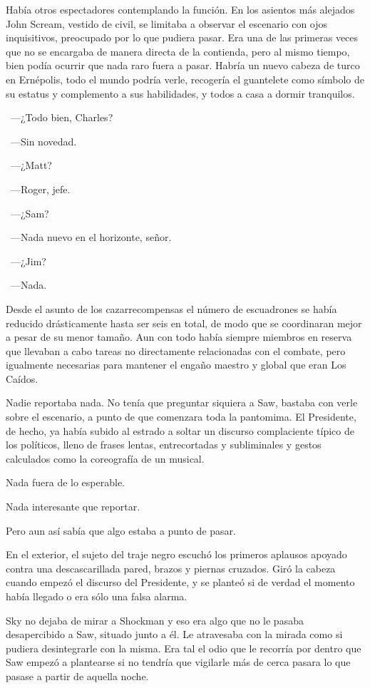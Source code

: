 Había otros espectadores contemplando la función. En los asientos más alejados John Scream, vestido de civil, se limitaba a observar el escenario con ojos inquisitivos, preocupado por lo que pudiera pasar. Era una de las primeras veces que no se encargaba de manera directa de la contienda, pero al mismo tiempo, bien podía ocurrir que nada raro fuera a pasar. Habría un nuevo cabeza de turco en Ernépolis, todo el mundo podría verle, recogería el guantelete como símbolo de su estatus y complemento a sus habilidades, y todos a casa a dormir tranquilos.

~---¿Todo bien, Charles?

~---Sin novedad.

~---¿Matt?

~---Roger, jefe.

~---¿Sam?

~---Nada nuevo en el horizonte, señor.

~---¿Jim?

~---Nada.

Desde el asunto de los cazarrecompensas el número de escuadrones se había reducido drásticamente hasta ser seis en total, de modo que se coordinaran mejor a pesar de su menor tamaño. Aun con todo había siempre miembros en reserva que llevaban a cabo tareas no directamente relacionadas con el combate, pero igualmente necesarias para mantener el engaño maestro y global que eran Los Caídos.

Nadie reportaba nada. No tenía que preguntar siquiera a Saw, bastaba con verle sobre el escenario, a punto de que comenzara toda la pantomima. El Presidente, de hecho, ya había subido al estrado a soltar un discurso complaciente típico de los políticos, lleno de frases lentas, entrecortadas y subliminales y gestos calculados como la coreografía de un musical.

Nada fuera de lo esperable.

Nada interesante que reportar.

Pero aun así sabía que algo estaba a punto de pasar.

En el exterior, el sujeto del traje negro escuchó los primeros aplausos apoyado contra una descascarillada pared, brazos y piernas cruzados. Giró la cabeza cuando empezó el discurso del Presidente, y se planteó si de verdad el momento había llegado o era sólo una falsa alarma.

Sky no dejaba de mirar a Shockman y eso era algo que no le pasaba desapercibido a Saw, situado junto a él. Le atravesaba con la mirada como si pudiera desintegrarle con la misma. Era tal el odio que le recorría por dentro que Saw empezó a plantearse si no tendría que vigilarle más de cerca pasara lo que pasase a partir de aquella noche.

